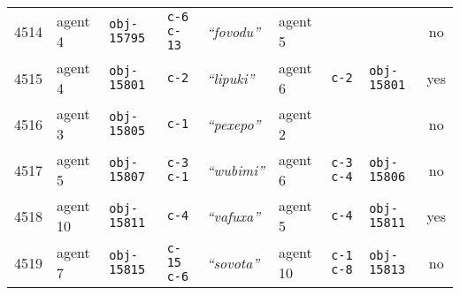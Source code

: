 {\begin{tabular}{@{}llllllllc@{}}
4514 & agent 4 & \texttt{obj-15795} & \texttt{c-6 c-13} & \textit{``fovodu''} & agent 5 & \texttt{} &  & no \\
4515 & agent 4 & \texttt{obj-15801} & \texttt{c-2} & \textit{``lipuki''} & agent 6 & \texttt{c-2} & \texttt{obj-15801} & yes \\
4516 & agent 3 & \texttt{obj-15805} & \texttt{c-1} & \textit{``pexepo''} & agent 2 & \texttt{} &  & no \\
4517 & agent 5 & \texttt{obj-15807} & \texttt{c-3 c-1} & \textit{``wubimi''} & agent 6 & \texttt{c-3 c-4} & \texttt{obj-15806} & no \\
4518 & agent 10 & \texttt{obj-15811} & \texttt{c-4} & \textit{``vafuxa''} & agent 5 & \texttt{c-4} & \texttt{obj-15811} & yes \\
4519 & agent 7 & \texttt{obj-15815} & \texttt{c-15 c-6} & \textit{``sovota''} & agent 10 & \texttt{c-1 c-8} & \texttt{obj-15813} & no \\
 \end{tabular}}


